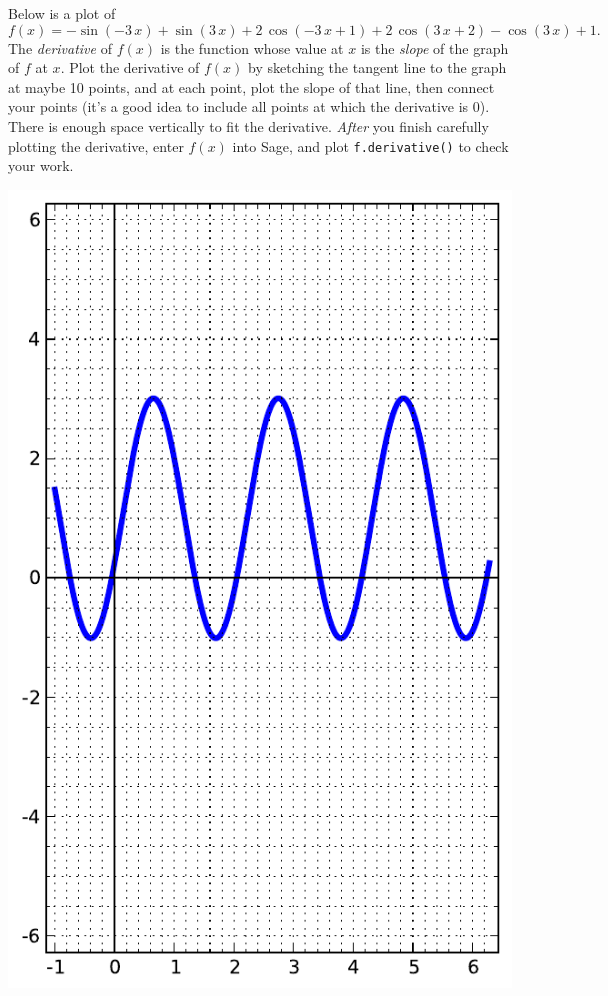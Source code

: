 Below is a plot of $$f(x)=-\sin\left(-3 \, x\right) + \sin\left(3 \, x\right) + 2 \, \cos\left(-3 \, x + 1\right) + 2 \, \cos\left(3 \, x + 2\right) - \cos\left(3 \, x\right) + 1.$$  The {\em \color{red}derivative} of $f(x)$ is the function whose value at $x$ is the {\em slope} of the graph of $f$ at $x$.  Plot the derivative of $f(x)$ by sketching the tangent line to the graph at maybe 10 points, and at each point, plot the slope of that line, then connect your points (it's a good idea to include all points at which the derivative is 0).  There is enough space vertically to fit the derivative.  {\em After} you finish carefully plotting the derivative, enter $f(x)$ into Sage, and plot {\color{blue}\verb|f.derivative()|} to check your work.
\begin{center}\includegraphics{functions/4.pdf}\end{center}\newpage

